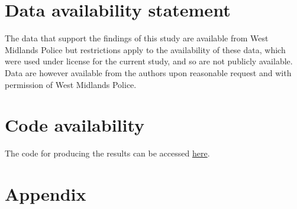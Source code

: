 \documentclass[12pt, letterpaper]{article}
\begin{document}
\section*{Data availability statement}

The data that support the findings of this study are available from West Midlands Police
but restrictions apply to the availability of these data, which were used under license
for the current study, and so are not publicly available. Data are however available
from the authors upon reasonable request and with permission of West Midlands Police.

\section*{Code availability}

The code for producing the results can be accessed \href{https://osf.io/kg9yr/}{here}. 

\section*{Appendix}

\renewcommand{\thetable}{A\arabic{table}}
\renewcommand{\thefigure}{A\arabic{figure}}
\setcounter{table}{0}
\setcounter{figure}{0}
\end{document}
